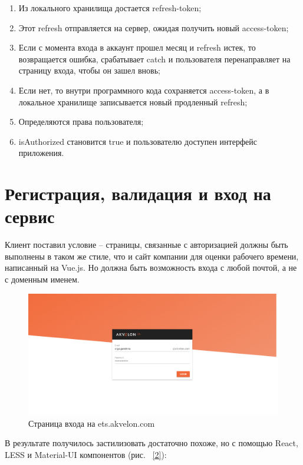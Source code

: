 \documentclass[12pt, a4paper]{diplom}
\begin{document}
\begin{enumerate}
\item Из локального хранилища достается refresh-token;
\item Этот refresh отправляется на сервер, ожидая получить новый access-token;
\item Если с момента входа в аккаунт прошел месяц и refresh истек, то возвращается ошибка, срабатывает catch и пользователя перенаправляет на страницу входа, чтобы он зашел вновь;
\item Если нет, то внутри программного кода сохраняется access-token, а в локальное хранилище записывается новый продленный refresh;
\item Определяются права пользователя;
\item isAuthorized становится true и пользователю доступен интерфейс приложения.

\end{enumerate}

\section{Регистрация, валидация и вход на сервис}

Клиент поставил условие -- страницы, связанные с авторизацией должны быть выполнены в таком же стиле, что и сайт компании для
оценки рабочего времени, написанный на Vue.js. Но должна быть возможность входа с любой почтой, а не с доменным именем.

\begin{figure}[!ht]
\centering
\includegraphics[width=1\textwidth]{resources/ets.png}
\caption{Страница входа на ets.akvelon.com}
\label{fig:1}
\end{figure}

В результате получилось застилизовать достаточно похоже, но с помощью React, LESS и Material-UI компонентов (рис. ~\ref{2}):
\end{document}
